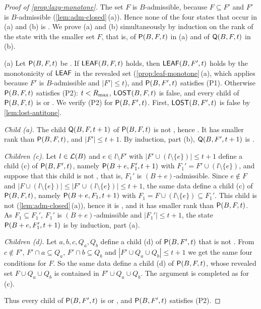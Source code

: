 \begin{proof}[Proof of \cref{prop:lazy-monotone}]
The set $F$ is $B$-admissible, because $F\subseteq F'$ and $F'$ is $B$-admissible
(\cref{lem:adm-closed}\,(a)). Hence none of the four states that occur in (a) and (b) is \VOID. We prove (a)
and (b) simultaneously by induction on the rank of the state with the smaller set $F$, that is, of
$\mathsf{P}(B,F,t)$ in (a) and of $\mathsf{Q}(B,F,t)$ in (b).

(a) Let $\mathsf{P}(B,F,t)$ be \WON. If $\mathsf{LEAF}(B,F,t)$ holds, then $\mathsf{LEAF}(B,F',t)$ holds by the monotonicity of
$\mathsf{LEAF}$ in the revealed set (\cref{prop:leaf-monotone}\,(a), which applies because $F'$ is
$B$-admissible and $|F'|\le t$), and $\mathsf{P}(B,F',t)$ satisfies (P1). Otherwise $\mathsf{P}(B,F,t)$ satisfies (P2):
$t<R_{\max}$, $\mathsf{LOST}(B,F,t)$ is false, and every child of $\mathsf{P}(B,F,t)$ is \WON{} or \VOID. We verify (P2) for
$\mathsf{P}(B,F',t)$. First, $\mathsf{LOST}(B,F',t)$ is false by \cref{lem:lost-antitone}.

\emph{Child \textup{(a)}.} The child $\mathsf{Q}(B,F,t+1)$ of $\mathsf{P}(B,F,t)$ is not \VOID, hence \WON. It has
smaller rank than $\mathsf{P}(B,F,t)$, and $|F'|\le t+1$. By induction, part (b), $\mathsf{Q}(B,F',t+1)$ is \WON.

\emph{Children \textup{(c)}.} Let $l\in\mathcal{L}(B)$ and $e\in l\setminus F'$ with
$|F'\cup(l\setminus\{e\})|\le t+1$ define a child \textup{(c)} of $\mathsf{P}(B,F',t)$, namely
$\mathsf{P}(B+e,F_1',t+1)$ with $F_1'=F'\cup(l\setminus\{e\})$, and suppose that this child is not \VOID, that is,
$F_1'$ is $(B+e)$-admissible. Since $e\notin F$ and
$|F\cup(l\setminus\{e\})|\le|F'\cup(l\setminus\{e\})|\le t+1$, the same data define a child \textup{(c)}
of $\mathsf{P}(B,F,t)$, namely $\mathsf{P}(B+e,F_1,t+1)$ with $F_1=F\cup(l\setminus\{e\})\subseteq F_1'$. This child is
not \VOID{} (\cref{lem:adm-closed}\,(a)), hence it is \WON, and it has smaller rank than $\mathsf{P}(B,F,t)$. As
$F_1\subseteq F_1'$, $F_1'$ is $(B+e)$-admissible and $|F_1'|\le t+1$, the state $\mathsf{P}(B+e,F_1',t+1)$ is \WON{}
by induction, part (a).

\emph{Children \textup{(d)}.} Let $a,b,c,Q_a,Q_b$ define a child \textup{(d)} of $\mathsf{P}(B,F',t)$ that is not
\VOID. From $c\notin F'$, $F'\cap a\subseteq Q_a$, $F'\cap b\subseteq Q_b$ and $|F'\cup Q_a\cup Q_b|\le t+1$ we
get the same four conditions for $F$. So the same data define a child \textup{(d)} of $\mathsf{P}(B,F,t)$, whose
revealed set $F\cup Q_a\cup Q_b$ is contained in $F'\cup Q_a\cup Q_b$. The argument is completed as for
\textup{(c)}.

Thus every child of $\mathsf{P}(B,F',t)$ is \WON{} or \VOID, and $\mathsf{P}(B,F',t)$ satisfies (P2).


\end{proof}
